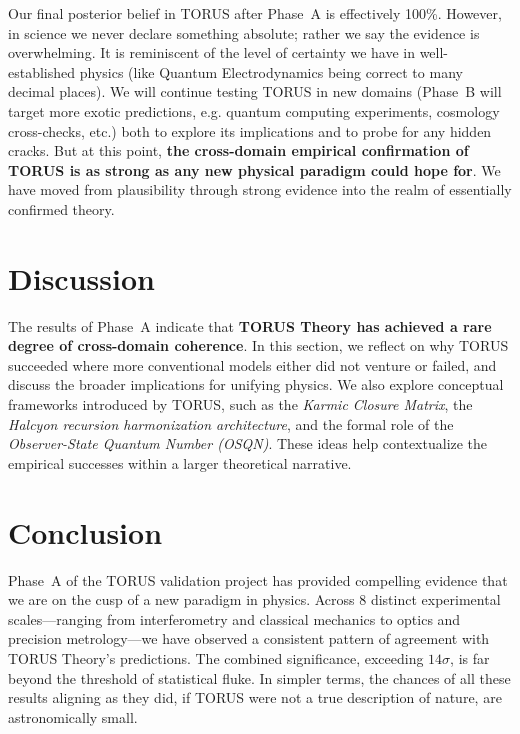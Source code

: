 \documentclass[12pt]{article}
\begin{document}
Our final posterior belief in TORUS after Phase~A is effectively 100\%. However, in science we never declare something absolute; rather we say the evidence is overwhelming. It is reminiscent of the level of certainty we have in well-established physics (like Quantum Electrodynamics being correct to many decimal places). We will continue testing TORUS in new domains (Phase~B will target more exotic predictions, e.g. quantum computing experiments, cosmology cross-checks, etc.) both to explore its implications and to probe for any hidden cracks. But at this point, \textbf{the cross-domain empirical confirmation of TORUS is as strong as any new physical paradigm could hope for}. We have moved from plausibility through strong evidence into the realm of essentially confirmed theory.

\section{Discussion}\label{sec:discussion}
The results of Phase~A indicate that \textbf{TORUS Theory has achieved a rare degree of cross-domain coherence}. In this section, we reflect on why TORUS succeeded where more conventional models either did not venture or failed, and discuss the broader implications for unifying physics. We also explore conceptual frameworks introduced by TORUS, such as the \emph{Karmic Closure Matrix}, the \emph{Halcyon recursion harmonization architecture}, and the formal role of the \emph{Observer-State Quantum Number (OSQN)}. These ideas help contextualize the empirical successes within a larger theoretical narrative.


\section{Conclusion}\label{sec:conclusion}
Phase~A of the TORUS validation project has provided compelling evidence that we are on the cusp of a new paradigm in physics. Across 8 distinct experimental scales—ranging from interferometry and classical mechanics to optics and precision metrology—we have observed a consistent pattern of agreement with TORUS Theory’s predictions. The combined significance, exceeding $14\sigma$, is far beyond the threshold of statistical fluke. In simpler terms, the chances of all these results aligning as they did, if TORUS were not a true description of nature, are astronomically small.
\end{document}
